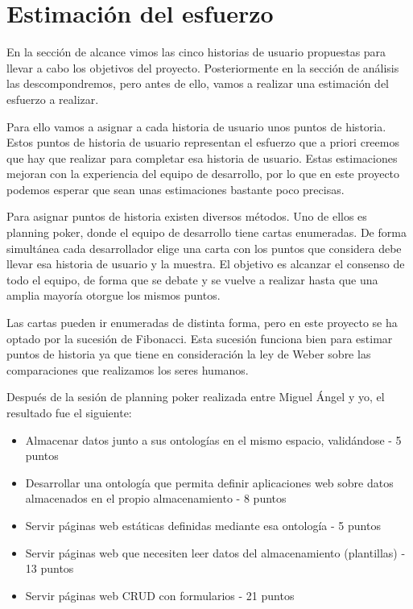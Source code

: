 \documentclass[12pt]{report} %
\begin{document}
\section{Estimación del esfuerzo}

En la sección de alcance vimos las cinco historias de usuario propuestas para llevar a cabo los objetivos del proyecto. Posteriormente en la sección de análisis las descompondremos, pero antes de ello, vamos a realizar una estimación del esfuerzo a realizar.

Para ello vamos a asignar a cada historia de usuario unos puntos de historia. Estos puntos de historia de usuario representan el esfuerzo que a priori creemos que hay que realizar para completar esa historia de usuario. Estas estimaciones mejoran con la experiencia del equipo de desarrollo, por lo que en este proyecto podemos esperar que sean unas estimaciones bastante poco precisas. 

Para asignar puntos de historia existen diversos métodos. Uno de ellos es planning poker, donde el equipo de desarrollo tiene cartas enumeradas. De forma simultánea cada desarrollador elige una carta con los puntos que considera debe llevar esa historia de usuario y la muestra. El objetivo es alcanzar el consenso de todo el equipo, de forma que se debate y se vuelve a realizar hasta que una amplia mayoría otorgue los mismos puntos.

Las cartas pueden ir enumeradas de distinta forma, pero en este proyecto se ha optado por la sucesión de Fibonacci. Esta sucesión funciona bien para estimar puntos de historia ya que tiene en consideración la ley de Weber sobre las comparaciones que realizamos los seres humanos.\cite{fibonacci}

Después de la sesión de planning poker realizada entre Miguel Ángel y yo, el resultado fue el siguiente:

\begin{itemize}
    \item Almacenar datos junto a sus ontologías en el mismo espacio, validándose - 5 puntos
    \item Desarrollar una ontología que permita definir aplicaciones web sobre datos almacenados en el propio almacenamiento - 8 puntos
    \item Servir páginas web estáticas definidas mediante esa ontología - 5 puntos
    \item Servir páginas web que necesiten leer datos del almacenamiento (plantillas) - 13 puntos
    \item Servir páginas web CRUD con formularios - 21 puntos
\end{itemize}
\end{document}
